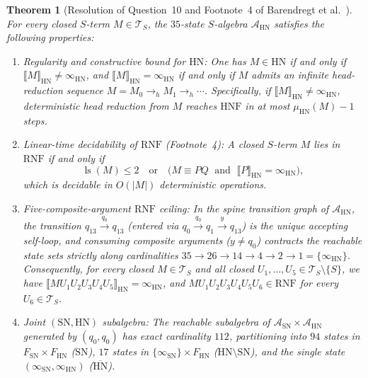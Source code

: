 \documentclass[11pt,reqno]{amsart}
\numberwithin{equation}{section}
\theoremstyle{plain}
\newtheorem{theorem}{Theorem}[section]
\theoremstyle{definition}
\theoremstyle{remark}
\DeclareMathOperator{\ls}{ls}
\newcommand{\TS}{\mathcal{T}_S}
\newcommand{\HNF}{\mathrm{HNF}}
\newcommand{\RNF}{\mathrm{RNF}}
\newcommand{\SN}{\mathrm{SN}}
\newcommand{\HN}{\mathrm{HN}}
\newcommand{\sem}[1]{\llbracket #1 \rrbracket}
\begin{document}
\begin{theorem}[Resolution of Question~10 and Footnote~4 of Barendregt et al.\ {\cite[p.~86]{BarendregtEndrullisKlopWaldmann2017}}]\label{thm:question-10}
For every closed $S$-term $M \in \TS$, the $35$-state $S$-algebra $\mathcal{A}_{\HN}$ satisfies the following properties:
\begin{enumerate}[label=(\roman*),leftmargin=2.2em]
  \item \emph{Regularity and constructive bound for $\HN$:} One has $M \in \HN$ if and only if $\sem{M}_{\HN} \neq \infty_{\HN}$, and $\sem{M}_{\HN} = \infty_{\HN}$ if and only if $M$ admits an infinite head-reduction sequence $M = M_0 \to_h M_1 \to_h \cdots$. Specifically, if $\sem{M}_{\HN} \neq \infty_{\HN}$, deterministic head reduction from $M$ reaches $\HNF$ in at most $\mu_{\HN}(M) - 1$ steps.
  \item \emph{Linear-time decidability of $\RNF$ (Footnote~4):} A closed $S$-term $M$ lies in $\RNF$ if and only if
  \begin{equation}\label{eq:footnote4-rnf}
  \ls(M) \le 2 \quad\textrm{or}\quad \bigl(M \equiv P Q \;\textrm{ and }\; \sem{P}_{\HN} = \infty_{\HN}\bigr),
  \end{equation}
  which is decidable in $O(|M|)$ deterministic operations.
  \item \emph{Five-composite-argument $\RNF$ ceiling:} In the spine transition graph of $\mathcal{A}_{\HN}$, the transition $q_{13} \xrightarrow{q_0} q_{13}$ (entered via $q_0 \xrightarrow{q_0} q_1 \xrightarrow{y} q_{13}$) is the unique accepting self-loop, and consuming composite arguments ($y \neq q_0$) contracts the reachable state sets strictly along cardinalities $35 \to 26 \to 14 \to 4 \to 2 \to 1 = \{\infty_{\HN}\}$. Consequently, for every closed $M \in \TS$ and all closed $U_1, \dots, U_5 \in \TS \setminus \{S\}$, we have $\sem{M U_1 U_2 U_3 U_4 U_5}_{\HN} = \infty_{\HN}$, and $M U_1 U_2 U_3 U_4 U_5 U_6 \in \RNF$ for every $U_6 \in \TS$.
  \item \emph{Joint $(\SN, \HN)$ subalgebra:} The reachable subalgebra of $\mathcal{A}_{\SN} \times \mathcal{A}_{\HN}$ generated by $(q_0, q_0)$ has exact cardinality $112$, partitioning into $94$ states in $F_{\SN} \times F_{\HN}$ ($\SN$), $17$ states in $\{\infty_{\SN}\} \times F_{\HN}$ ($\HN \setminus \SN$), and the single state $(\infty_{\SN}, \infty_{\HN})$ ($\overline{\HN}$).
\end{enumerate}
\end{theorem}
\end{document}
